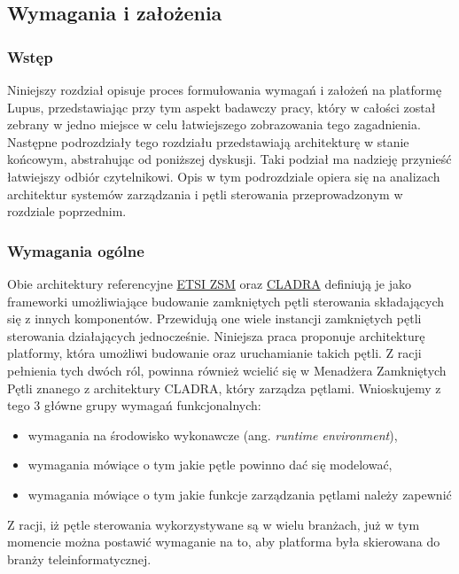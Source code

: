 \subsection{Wymagania i założenia}\label{sec:32}

\subsubsection{Wstęp}

Niniejszy rozdział opisuje proces formułowania wymagań i założeń na platformę Lupus, przedstawiając przy tym aspekt badawczy pracy, który w całości został zebrany w jedno miejsce w celu łatwiejszego zobrazowania tego zagadnienia. Następne podrozdziały tego rozdziału przedstawiają architekturę w stanie końcowym, abstrahując od poniższej dyskusji. Taki podział ma nadzieję przynieść łatwiejszy odbiór czytelnikowi. Opis w tym podrozdziale opiera się na analizach architektur systemów zarządzania i pętli sterowania przeprowadzonym w rozdziale poprzednim.

\subsubsection{Wymagania ogólne}

Obie architektury referencyjne \hyperlink{sec:zsm}{ETSI ZSM} oraz \hyperlink{sec:cladra}{CLADRA} definiują je jako frameworki umożliwiające budowanie zamkniętych pętli sterowania składających się z innych komponentów. Przewidują one wiele instancji zamkniętych pętli sterowania działających jednocześnie. Niniejsza praca proponuje architekturę platformy, która umożliwi budowanie oraz uruchamianie takich pętli. Z racji pełnienia tych dwóch ról, powinna również wcielić się w Menadżera Zamkniętych Pętli znanego z architektury CLADRA, który zarządza pętlami. Wnioskujemy z tego 3 główne grupy wymagań funkcjonalnych:
\begin{itemize}
    \item wymagania na środowisko wykonawcze (ang. \textit{runtime environment}), 
    \item wymagania mówiące o tym jakie pętle powinno dać się modelować,
    \item wymagania mówiące o tym jakie funkcje zarządzania pętlami należy zapewnić
\end{itemize}

Z racji, iż pętle sterowania wykorzystywane są w wielu branżach, już w tym momencie można postawić wymaganie na to, aby platforma była skierowana do branży teleinformatycznej. 

